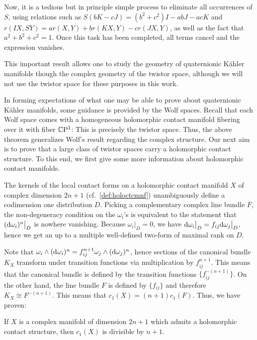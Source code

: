 \begin{myproof}
	Now, it is a tedious but in principle simple process to eliminate all occurrences of $S$, using relations such as $S(bK-cJ)=(b^2+c^2)I-abJ-acK$ and $r(IX,SY)=ar(X,Y)+br(KX,Y)-cr(JX,Y)$, as well as the fact that $a^2+b^2+c^2=1$. Once this task has been completed, all terms cancel and the expression vanishes.
\end{myproof}

This important result allows one to study the geometry of quaternionic K\"ahler manifolds though the complex geometry of the twistor space, although we will not use the twistor space for these purposes in this work. 

In forming expectations of what one may be able to prove about quaternionic K\"ahler manifolds, some guidance is provided by the Wolf spaces. Recall that each Wolf space comes with a homogeneous holomorphic contact manifold fibering over it with fiber $\mathbb{C}\mathrm{P}^1$: This is precisely the twistor space. Thus, the above theorem generalizes Wolf's result regarding the complex structure. Our next aim is to prove that a large class of twistor spaces carry a holomorphic contact structure. To this end, we first give some more information about holomorphic contact manifolds.

The kernels of the local contact forms on a holomorphic contact manifold $X$ of complex dimension $2n+1$ (cf.~\cref{def:holoctcmnf}) unambiguously define a codimension one distribution $D$. Picking a complementary complex line bundle $F$, the non-degeneracy condition on the $\omega_i$'s is equivalent to the statement that $(\mathrm{d} \omega_i)^n\big|_D$ is nowhere vanishing. Because $\omega_i\big|_D=0$, we have $\mathrm{d} \omega_i\big|_D=f_{ij}\mathrm{d} \omega_j\big|_D$, hence we get an up to a multiple well-defined two-form of maximal rank on $D$. 

Note that $\omega_i\wedge (\mathrm{d} \omega_i)^n=f_{ij}^{n+1}\omega_j\wedge (\mathrm{d}\omega_j)^n$, hence sections of the canonical bundle $K_X$ transform under transition functions via multiplication by $f_{ij}^{n+1}$. This means that the canonical bundle is defined by the transition functions $\big\{f_{ij}^{-(n+1)}\big\}$. On the other hand, the line bundle $F$ is defined by $\{f_{ij}\}$ and therefore $K_X\cong F^{-(n+1)}$. This means that $c_1(X)=(n+1)c_1(F)$. Thus, we have proven:

\begin{prop}\label{prop:cpxctcdivisible}
	If $X$ is a complex manifold of dimension $2n+1$ which admits a holomorphic contact structure, then $c_1(X)$ is divisible by $n+1$.
\end{prop}

